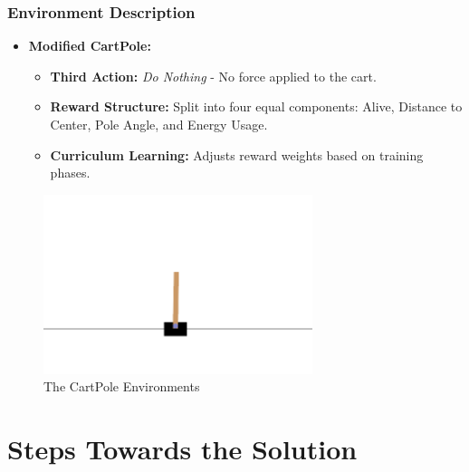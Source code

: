 \documentclass{beamer}
\begin{document}
\begin{frame}
\frametitle{Environment Description}
\begin{itemize}
    \item \textbf{Modified CartPole:}
    \begin{itemize}
        \item \textbf{Third Action:} \textit{Do Nothing} - No force applied to the cart.
        \item \textbf{Reward Structure:} Split into four equal components: Alive, Distance to Center, Pole Angle, and Energy Usage.
        \item \textbf{Curriculum Learning:} Adjusts reward weights based on training phases.
    \end{itemize}
\end{itemize}

\begin{figure}[ht]
    \centering
    \includegraphics[width=0.7\textwidth]{images/cart_pole.png}
    \caption{The CartPole Environments}
    \label{fig:env_comparison}
\end{figure}
\end{frame}

\section{Steps Towards the Solution}
\end{document}

